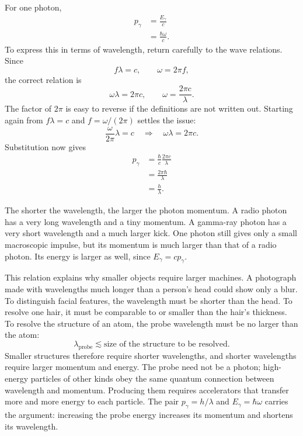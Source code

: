 For one photon,
\begin{align}
p_\gamma
&=\frac{E_\gamma}{c}\\
&=\frac{\hbar\omega}{c}.
\end{align}
To express this in terms of wavelength, return carefully to the wave relations. Since
\begin{equation}
f\lambda=c,
\qquad
\omega=2\pi f,
\end{equation}
the correct relation is
\begin{equation}
\omega\lambda=2\pi c,
\qquad
\omega=\frac{2\pi c}{\lambda}.
\end{equation}
The factor of \(2\pi\) is easy to reverse if the definitions are not written out. Starting again from \(f\lambda=c\) and \(f=\omega/(2\pi)\) settles the issue:
\begin{equation}
\frac{\omega}{2\pi}\lambda=c
\quad\Longrightarrow\quad
\omega\lambda=2\pi c.
\end{equation}
Substitution now gives
\begin{align}
p_\gamma
&=\frac{\hbar}{c}\frac{2\pi c}{\lambda}\\
&=\frac{2\pi\hbar}{\lambda}\\
&=\frac{h}{\lambda}.
\end{align}

\begin{classroomqa}
\end{classroomqa}

The shorter the wavelength, the larger the photon momentum. A radio photon has a very long wavelength and a tiny momentum. A gamma-ray photon has a very short wavelength and a much larger kick. One photon still gives only a small macroscopic impulse, but its momentum is much larger than that of a radio photon. Its energy is larger as well, since \(E_\gamma=cp_\gamma\).

This relation explains why smaller objects require larger machines. A photograph made with wavelengths much longer than a person's head could show only a blur. To distinguish facial features, the wavelength must be shorter than the head. To resolve one hair, it must be comparable to or smaller than the hair's thickness. To resolve the structure of an atom, the probe wavelength must be no larger than the atom:
\begin{equation}
\lambda_{\mathrm{probe}}\lesssim
\text{size of the structure to be resolved}.
\end{equation}
Smaller structures therefore require shorter wavelengths, and shorter wavelengths require larger momentum and energy. The probe need not be a photon; high-energy particles of other kinds obey the same quantum connection between wavelength and momentum. Producing them requires accelerators that transfer more and more energy to each particle. The pair \(p_\gamma=h/\lambda\) and \(E_\gamma=\hbar\omega\) carries the argument: increasing the probe energy increases its momentum and shortens its wavelength.

